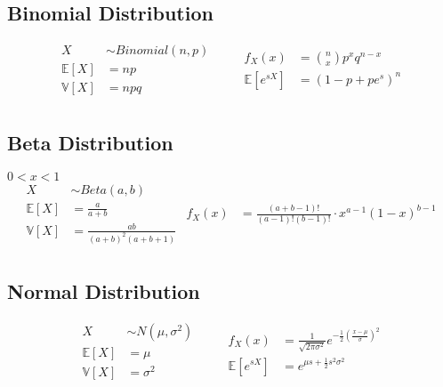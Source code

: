 \subsection{Binomial Distribution}
\begin{equation*}
    \begin{aligned}
        X &\sim Binomial(n, p) \qquad\\
        \mathbb{E}[X] &= np \\
        \mathbb{V}[X] &= npq \\
    \end{aligned}
    \begin{aligned}
        f_X(x) &= \binom{n}{x} p^x q^{n-x} \\
        \mathbb{E}[e^{sX}] &= (1 - p + pe^s)^n \\
    \end{aligned}
\end{equation*}

\subsection{Beta Distribution}
\(0 < x < 1\)
\begin{equation*}
    \begin{aligned}
        X &\sim Beta(a, b) \qquad\\
        \mathbb{E}[X] &= \frac{a}{a + b} \\
        \mathbb{V}[X] &= \frac{ab}{(a + b)^2(a + b + 1)}\\
    \end{aligned}
    \begin{aligned}
        f_X(x) &= \frac{(a + b - 1)!}{(a - 1)! (b - 1)!} \cdot x^{a-1} (1 - x)^{b-1} \\
    \end{aligned}
\end{equation*}

\subsection{Normal Distribution}
\begin{equation*}
    \begin{aligned}
        X &\sim N(\mu, \sigma^2) \qquad\\
        \mathbb{E}[X] &= \mu \\
        \mathbb{V}[X] &= \sigma^2 \\
    \end{aligned}
    \begin{aligned}
        f_X(x) &= \frac{1}{\sqrt{2\pi\sigma^2}} e^{-\frac{1}{2}\left(\frac{x - \mu}{\sigma}\right)^2} \\
        \mathbb{E}[e^{sX}] &= e^{\mu s + \frac{1}{2}s^2\sigma^2} \\
    \end{aligned}
\end{equation*}

